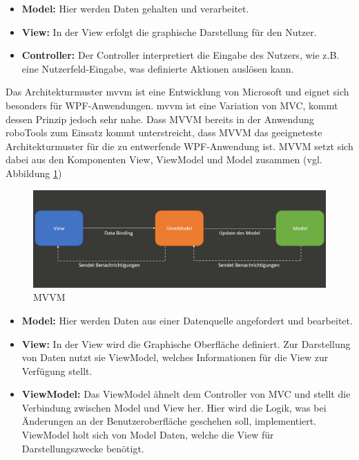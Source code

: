 \documentclass[ a4paper,
                oneside,
                toc=bibliography,
                toc=listof
                ]{scrbook}
\begin{document}
	\begin{itemize}
		\item \textbf{Model: }Hier werden Daten gehalten und verarbeitet.
		\item \textbf{View: } In der View erfolgt die graphische Darstellung für den Nutzer.
		\item \textbf{Controller: } Der Controller interpretiert die Eingabe des Nutzers, wie z.B. eine Nutzerfeld-Eingabe, was definierte Aktionen auslösen kann.
	\end{itemize}
	Das Architekturmuster \acs{mvvm} ist eine Entwicklung von Microsoft und eignet sich besonders für WPF-Anwendungen. \ac{mvvm} ist eine Variation von MVC, kommt dessen Prinzip jedoch sehr nahe. \cite{MVVMKraus} \cite{kotz2022c} \cite{troelsen2022pro}
	Dass MVVM bereits in der Anwendung roboTools zum Einsatz kommt unterstreicht, dass MVVM das geeigneteste Architekturmuster für die zu entwerfende WPF-Anwendung ist. MVVM setzt sich dabei aus den Komponenten View, ViewModel und Model zusammen (vgl. Abbildung \ref{fig:MVVM})
	\begin{figure}[!ht]
		\centering
		\includegraphics[width=1.0\linewidth]{./images/MVVM.png}
		\caption{MVVM \cite{MVVMKraus}}
		\label{fig:MVVM}
	\end{figure}
	\begin{itemize}
		\item \textbf{Model: } Hier werden Daten aus einer Datenquelle angefordert und bearbeitet.
		\item \textbf{View: } In der View wird die Graphische Oberfläche definiert. Zur Darstellung von Daten nutzt sie ViewModel, welches Informationen für die View zur Verfügung stellt.
		\item \textbf{ViewModel: } Das ViewModel ähnelt dem Controller von MVC und stellt die Verbindung zwischen Model und View her. Hier wird die Logik, was bei Änderungen an der Benutzeroberfläche geschehen soll, implementiert. ViewModel holt sich von Model Daten, welche die View für Darstellungszwecke benötigt. \cite{MVVMKraus} \cite{troelsen2022pro}
	\end{itemize}
\end{document}
